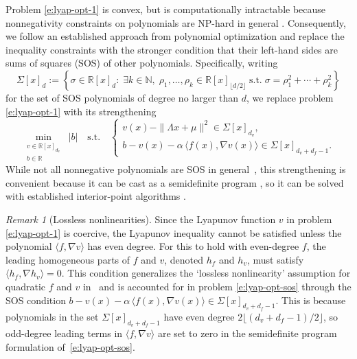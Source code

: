 \documentclass[11pt]{amsart}
\numberwithin{equation}{section}
\theoremstyle{plain}
\theoremstyle{definition}
\theoremstyle{remark}
\newtheorem{remark}{Remark}[section]
\newcommand{\R}{\mathbb{R}}
\newcommand{\N}{\mathbb{N}}
\renewcommand{\vec}[1]{{#1}}
\newcommand{\mat}[1]{{#1}}
\newcommand{\ip}[2]{\langle #1, #2 \rangle}
\begin{document}
Problem \cref{e:lyap-opt-1} is convex, but is computationally intractable because nonnegativity constraints on polynomials are NP-hard in general \cite{Murty1987}. Consequently, we follow an established approach from polynomial optimization and replace the inequality constraints with the stronger condition that their left-hand sides are sums of squares (SOS) of other polynomials. Specifically, writing
\begin{equation*}
    \Sigma[\vec{x}]_{d} := \left\{ \sigma \in \R[\vec{x}]_d:\;\exists k\in\N,\; \rho_1,\ldots,\rho_k \in \R[\vec{x}]_{\lfloor d/2\rfloor} \; \text{s.t.}\; \sigma = \rho_1^2 + \cdots + \rho_k^2  \right\}
\end{equation*}
for the set of SOS polynomials of degree no larger than $d$, we replace problem \cref{e:lyap-opt-1} with its strengthening
\begin{equation}\label{e:lyap-opt-sos}
    \min_{\substack{v \in \R[\vec{x}]_{d_v} \\ b \in \R}} \; |b| \quad
    \text{s.t.} \quad 
    \begin{cases}
        v(\vec{x}) -  \|\mat{\Lambda} \vec{x} + \vec{\mu}\|^2 \in \Sigma[\vec{x}]_{d_v}, \\
        b - v(\vec{x}) - \alpha\,  \ip{\vec{f}(\vec{x})}{\nabla v(\vec{x})}  \in \Sigma[\vec{x}]_{d_v + d_f - 1}.
    \end{cases}
\end{equation}
While not all nonnegative polynomials are SOS in general~\cite{Hilbert1888}, this strengthening is convenient because it can be cast as a semidefinite program \cite{Lasserre2001, Parrilo2003, Nesterov2000, Lasserre2010, Parrilo2013, Laurent2009}, so it can be solved with established interior-point algorithms \cite{Nesterov1994, Ye1997, Nemirovski2007}. 
\begin{remark}[Lossless nonlinearities]\label{rem:lossless-nnl}
    Since the Lyapunov function $v$ in problem \cref{e:lyap-opt-1} is coercive, the Lyapunov inequality cannot be satisfied unless the polynomial $\ip{\vec{f}}{\nabla v}$ has even degree. For this to hold with even-degree $f$, the leading homogeneous parts of $f$ and $v$, denoted $h_f$ and $h_v$, must satisfy $\ip{h_f}{\nabla h_v} = 0$. This condition generalizes the `lossless nonlinearity' assumption for quadratic $f$ and $v$ in~\cite{kaptanoglu2021,liao2025lossless,heide2025} and is accounted for in problem \cref{e:lyap-opt-sos} through the SOS condition $b - v(\vec{x}) - \alpha\,  \ip{\vec{f}(\vec{x})}{\nabla v(\vec{x})}  \in \Sigma[\vec{x}]_{d_v + d_f - 1}$. This is because polynomials in the set $\Sigma[\vec{x}]_{d_v + d_f - 1}$ have even degree $2\lfloor (d_v + d_f - 1) / 2 \rfloor$, so odd-degree leading terms in $\ip{\vec{f}}{\nabla v}$ are set to zero in the semidefinite program formulation of~\cref{e:lyap-opt-sos}.
\end{remark}
\end{document}
